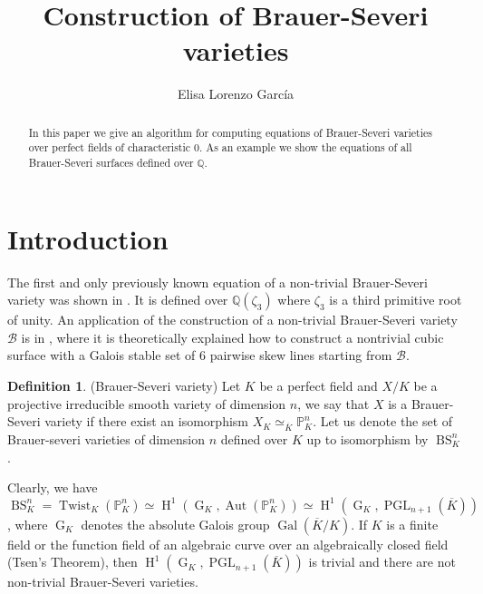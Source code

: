 \documentclass[a4paper,10pt]{amsart}
\author[E. Lorenzo Garc\'ia]{Elisa Lorenzo Garc\'ia}
\theoremstyle{plain}
\theoremstyle{definition}
\newtheorem{definition}[theorem]{Definition}
\theoremstyle{remark}
\numberwithin{equation}{section}
\begin{document}
\title{Construction of Brauer-Severi varieties}

\begin{abstract}
In this paper we give an algorithm for computing equations of Brauer-Severi varieties over perfect fields of characteristic $0$. As an example we show the equations of all Brauer-Severi surfaces defined over $\mathbb{Q}$.
\end{abstract}

\maketitle

\section{Introduction}

The first and only previously known equation of a non-trivial Brauer-Severi variety was shown in \cite{BaBaEl1}. It is defined over ${\mathbb{Q}}(\zeta_3)$ where $\zeta_3$ is a third primitive root of unity. An application of the construction of a non-trivial Brauer-Severi variety $\mathcal{B}$ is in \cite{Pa}, where it is theoretically explained how to construct a nontrivial cubic surface with a Galois stable set of 6 pairwise skew lines starting from $\mathcal{B}$. 

\begin{definition}(Brauer-Severi variety) Let $K$ be a perfect field and $X/K$ be a projective irreducible smooth variety of dimension $n$, we say that $X$ is a Brauer-Severi variety if there exist an isomorphism $X_K\simeq_{\overline{K}}\mathbb{P}^{n}_{K}$. Let us denote the set of Brauer-severi varieties of dimension $n$ defined over $K$ up to isomorphism by $\operatorname{BS}_{K}^{n}$.
\end{definition}

Clearly, we have $\operatorname{BS}_{K}^{n}=\operatorname{Twist}_K(\mathbb{P}^{n}_{K})\simeq\operatorname{H}^1(\operatorname{G}_K,\operatorname{Aut}(\mathbb{P}_{K}^{n}))\simeq\operatorname{H}^1(\operatorname{G}_K,\operatorname{PGL}_{n+1}(\overline{K}))$, where $\operatorname{G}_K$ denotes the absolute Galois group $\operatorname{Gal}(\overline{K}/K)$. If $K$ is a finite field or the function field of an algebraic curve over an algebraically closed field (Tsen's Theorem), then $\operatorname{H}^1(\operatorname{G}_K,\operatorname{PGL}_{n+1}(\overline{K}))$ is trivial and there are not non-trivial Brauer-Severi varieties.
\end{document}
